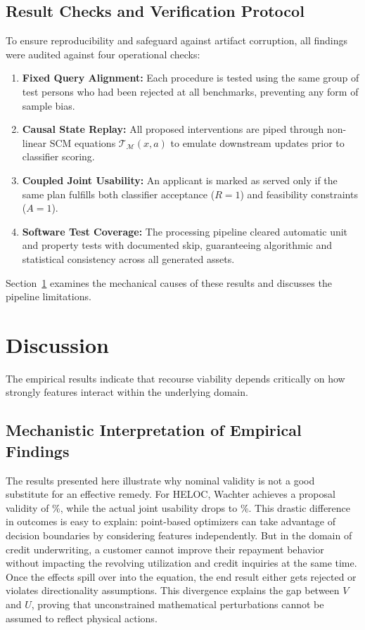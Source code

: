\documentclass[nolineno]{paper/ieee-access/ieeeaccess}%
\newcommand{\SCM}{\ensuremath{\mathcal{M}}}
\newcommand{\Replay}{\ensuremath{\mathcal{T}_{\SCM}}}
\begin{document}
\subsection{Result Checks and Verification Protocol}
To ensure reproducibility and safeguard against artifact corruption, all findings were audited against four operational checks:
\begin{enumerate}
\item \textbf{Fixed Query Alignment:} Each procedure is tested using the same group of \TotalApplicants{} test persons who had been rejected at all benchmarks, preventing any form of sample bias.
\item \textbf{Causal State Replay:} All proposed interventions are piped through non-linear SCM equations $\Replay(x, a)$ to emulate downstream updates prior to classifier scoring.
\item \textbf{Coupled Joint Usability:} An applicant is marked as served only if the same plan fulfills both classifier acceptance ($R=1$) and feasibility constraints ($A=1$).
\item \textbf{Software Test Coverage:} The processing pipeline cleared \TestsPassed{} automatic unit and property tests with \TestsSkipped{} documented skip, guaranteeing algorithmic and statistical consistency across all generated assets.
\end{enumerate}

Section~\ref{sec:discussion} examines the mechanical causes of these results and discusses the pipeline limitations.

\section{Discussion}
\label{sec:discussion}
The empirical results indicate that recourse viability depends critically on how strongly features interact within the underlying domain.

\subsection{Mechanistic Interpretation of Empirical Findings}
The results presented here illustrate why nominal validity is not a good substitute for an effective remedy. For HELOC, Wachter achieves a proposal validity of \HelocWachterValidity\%, while the actual joint usability drops to \HelocWachterUsable\%. This drastic difference in outcomes is easy to explain: point-based optimizers can take advantage of decision boundaries by considering features independently. But in the domain of credit underwriting, a customer cannot improve their repayment behavior without impacting the revolving utilization and credit inquiries at the same time. Once the effects spill over into the equation, the end result either gets rejected or violates directionality assumptions. This divergence explains the gap between $V$ and $U$, proving that unconstrained mathematical perturbations cannot be assumed to reflect physical actions.
\end{document}
